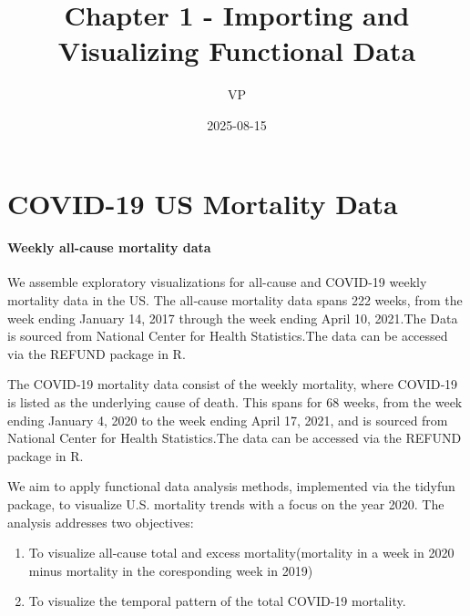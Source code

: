 \documentclass[
]{article}
\title{Chapter 1 - Importing and Visualizing Functional Data}
\author{VP}
\date{2025-08-15}
\begin{document}
\maketitle

\section{COVID-19 US Mortality Data}\label{covid-19-us-mortality-data}

\paragraph{Weekly all-cause mortality
data}\label{weekly-all-cause-mortality-data}

We assemble exploratory visualizations for all-cause and COVID-19 weekly
mortality data in the US. The all‑cause mortality data spans 222 weeks,
from the week ending January 14, 2017 through the week ending April 10,
2021.The Data is sourced from National Center for Health Statistics.The
data can be accessed via the REFUND package in R.

The COVID‑19 mortality data consist of the weekly mortality, where
COVID‑19 is listed as the underlying cause of death. This spans for 68
weeks, from the week ending January 4, 2020 to the week ending April 17,
2021, and is sourced from National Center for Health Statistics.The data
can be accessed via the REFUND package in R.

We aim to apply functional data analysis methods, implemented via the
tidyfun package, to visualize U.S. mortality trends with a focus on the
year 2020. The analysis addresses two objectives:

\begin{enumerate}
\def\labelenumi{\arabic{enumi}.}
\item
  To visualize all-cause total and excess mortality(mortality in a week
  in 2020 minus mortality in the coresponding week in 2019)
\item
  To visualize the temporal pattern of the total COVID-19 mortality.
\end{enumerate}
\end{document}
